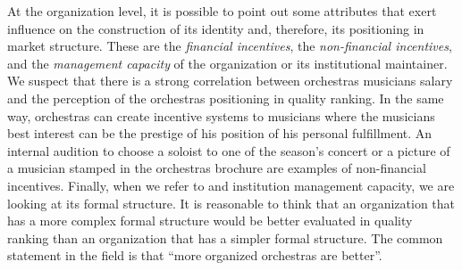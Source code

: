 \documentclass[a4paper, 12pt, openright, oneside, german, french, brazil, english]{abntex2}
\begin{document}
	
	At the organization level, it is possible to point out some attributes that exert influence on the construction of its identity and, therefore, its positioning in market structure. These are the \textit{financial incentives}, the \textit{non-financial incentives}, and  the \textit{management capacity} of the organization or its institutional maintainer. We suspect that there is a strong correlation between orchestras musicians salary and the perception of the orchestras positioning in quality ranking. In the same way, orchestras can create incentive systems to musicians where the musicians best interest can be the prestige of his position of his personal fulfillment. An internal audition to choose a soloist to one of the season's concert or a picture of a musician stamped in the orchestras brochure are examples of non-financial incentives. Finally, when we refer to and institution management capacity, we are looking at its formal structure. It is reasonable to think that an organization that has a more complex formal structure would be better evaluated in quality ranking than an organization that has a simpler formal structure. The common statement in the field is that ``more organized orchestras are better''.
	
\end{document}
